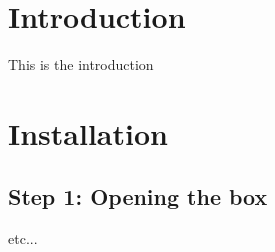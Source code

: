 \hypertarget{index_intro_sec}{}\section{Introduction}\label{index_intro_sec}
This is the introduction\hypertarget{index_install_sec}{}\section{Installation}\label{index_install_sec}
\hypertarget{index_step1}{}\subsection{Step 1\+: Opening the box}\label{index_step1}
etc... 